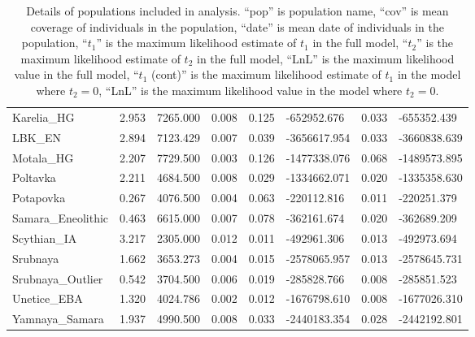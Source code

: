 \documentclass[11pt, oneside]{article}   	%
\begin{document}
\begin{table}[!p]
\begin{tabular}{llllllll}
Karelia\_HG             & 2.953  & 7265.000 & 0.008 & 0.125 & -652952.676  & 0.033       & -655352.439  \\
LBK\_EN                 & 2.894  & 7123.429 & 0.007 & 0.039 & -3656617.954 & 0.033       & -3660838.639 \\
Motala\_HG              & 2.207  & 7729.500 & 0.003 & 0.126 & -1477338.076 & 0.068       & -1489573.895 \\
Poltavka                & 2.211  & 4684.500 & 0.008 & 0.029 & -1334662.071 & 0.020       & -1335358.630 \\
Potapovka               & 0.267  & 4076.500 & 0.004 & 0.063 & -220112.816  & 0.011       & -220251.379  \\
Samara\_Eneolithic      & 0.463  & 6615.000 & 0.007 & 0.078 & -362161.674  & 0.020       & -362689.209  \\
Scythian\_IA            & 3.217  & 2305.000 & 0.012 & 0.011 & -492961.306  & 0.013       & -492973.694  \\
Srubnaya                & 1.662  & 3653.273 & 0.004 & 0.015 & -2578065.957 & 0.013       & -2578645.731 \\
Srubnaya\_Outlier       & 0.542  & 3704.500 & 0.006 & 0.019 & -285828.766  & 0.008       & -285851.523  \\
Unetice\_EBA            & 1.320  & 4024.786 & 0.002 & 0.012 & -1676798.610 & 0.008       & -1677026.310 \\
Yamnaya\_Samara         & 1.937  & 4990.500 & 0.008 & 0.033 & -2440183.354 & 0.028       & -2442192.801
\end{tabular}
\caption{Details of populations included in analysis. ``pop'' is population name, ``cov'' is mean coverage of individuals in the population, ``date'' is mean date of individuals in the population, ``$t_1$'' is the maximum likelihood estimate of $t_1$ in the full model, ``$t_2$'' is the maximum likelihood estimate of $t_2$ in the full model, ``LnL'' is the maximum likelihood value in the full model, ``$t_1$ (cont)'' is the maximum likelihood estimate of $t_1$ in the model where $t_2 = 0$, ``LnL'' is the maximum likelihood value in the model where $t_2 = 0$.}
\label{params_table}
\end{table}
\end{document}
